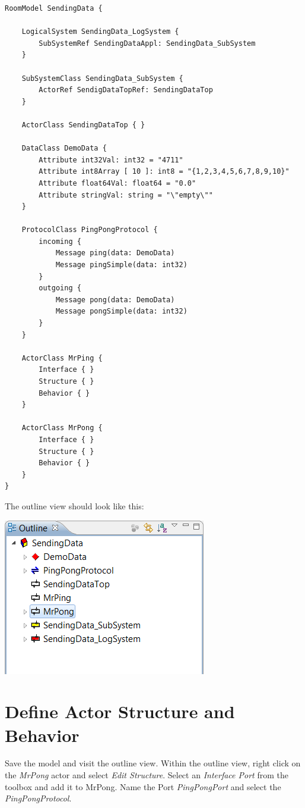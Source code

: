 \begin{verbatim}
RoomModel SendingData {

    LogicalSystem SendingData_LogSystem {
        SubSystemRef SendingDataAppl: SendingData_SubSystem
    }

    SubSystemClass SendingData_SubSystem {
        ActorRef SendigDataTopRef: SendingDataTop
    }

    ActorClass SendingDataTop { }

    DataClass DemoData {
        Attribute int32Val: int32 = "4711"
        Attribute int8Array [ 10 ]: int8 = "{1,2,3,4,5,6,7,8,9,10}"
        Attribute float64Val: float64 = "0.0"
        Attribute stringVal: string = "\"empty\""
    }

    ProtocolClass PingPongProtocol {
        incoming {
            Message ping(data: DemoData)
            Message pingSimple(data: int32)
        }
        outgoing {
            Message pong(data: DemoData)
            Message pongSimple(data: int32)
        }
    }

    ActorClass MrPing {
        Interface { }
        Structure { }
        Behavior { }
    }

    ActorClass MrPong {
        Interface { }
        Structure { }
        Behavior { }
    }
} 

\end{verbatim}

The outline view should look like this:

\includegraphics{images/025-SendingData03.png}

\section{Define Actor Structure and Behavior}

Save the model and visit the outline view. Within the outline view, right click on the \textit{MrPong} 
actor and select \textit{Edit Structure}. Select an \textit{Interface Port} from the toolbox and add it to 
MrPong. Name the Port \textit{PingPongPort} and select the \textit{PingPongProtocol}.

